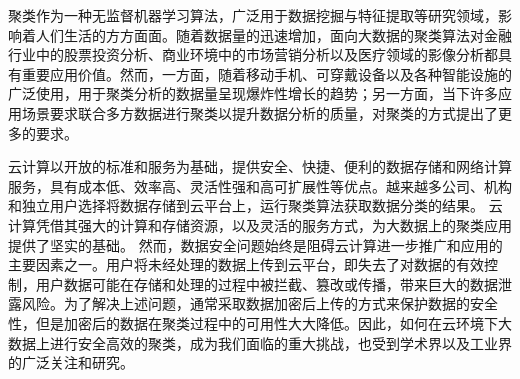 \begin{cabstract}
%

聚类作为一种无监督机器学习算法，广泛用于数据挖掘与特征提取等研究领域，影响着人们生活的方方面面。随着数据量的迅速增加，面向大数据的聚类算法对金融行业中的股票投资分析、商业环境中的市场营销分析以及医疗领域的影像分析都具有重要应用价值。然而，一方面，随着移动手机、可穿戴设备以及各种智能设施的广泛使用，用于聚类分析的数据量呈现爆炸性增长的趋势；另一方面，当下许多应用场景要求联合多方数据进行聚类以提升数据分析的质量，对聚类的方式提出了更多的要求。

云计算以开放的标准和服务为基础，提供安全、快捷、便利的数据存储和网络计算服务，具有成本低、效率高、灵活性强和高可扩展性等优点。越来越多公司、机构和独立用户选择将数据存储到云平台上，运行聚类算法获取数据分类的结果。
云计算凭借其强大的计算和存储资源，以及灵活的服务方式，为大数据上的聚类应用提供了坚实的基础。
然而，数据安全问题始终是阻碍云计算进一步推广和应用的主要因素之一。用户将未经处理的数据上传到云平台，即失去了对数据的有效控制，用户数据可能在存储和处理的过程中被拦截、篡改或传播，带来巨大的数据泄露风险。为了解决上述问题，通常采取数据加密后上传的方式来保护数据的安全性，但是加密后的数据在聚类过程中的可用性大大降低。因此，如何在云环境下大数据上进行安全高效的聚类，成为我们面临的重大挑战，也受到学术界以及工业界的广泛关注和研究。


\end{cabstract}
